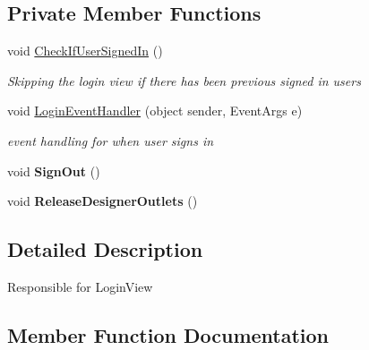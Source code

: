 \subsection*{Private Member Functions}
\begin{DoxyCompactItemize}
\item 
void \hyperlink{class_ramboell_1_1i_o_s_1_1_login_view_controller_a178185c28863ebd8a7918135534c508b}{Check\+If\+User\+Signed\+In} ()
\begin{DoxyCompactList}\small\item\em Skipping the login view if there has been previous signed in users \end{DoxyCompactList}\item 
void \hyperlink{class_ramboell_1_1i_o_s_1_1_login_view_controller_ab6b1b3b1ad0cc52e134869455ee8cad8}{Login\+Event\+Handler} (object sender, Event\+Args e)
\begin{DoxyCompactList}\small\item\em event handling for when user signs in \end{DoxyCompactList}\item 
\mbox{\label{class_ramboell_1_1i_o_s_1_1_login_view_controller_a2239a327cc26eda697b424d7c4d61969}} 
void {\bfseries Sign\+Out} ()
\item 
\mbox{\label{class_ramboell_1_1i_o_s_1_1_login_view_controller_add77014f1a30a9945553f070031962d1}} 
void {\bfseries Release\+Designer\+Outlets} ()
\end{DoxyCompactItemize}


\subsection{Detailed Description}
Responsible for Login\+View 



\subsection{Member Function Documentation}
\mbox{\label{class_ramboell_1_1i_o_s_1_1_login_view_controller_a178185c28863ebd8a7918135534c508b}} 
